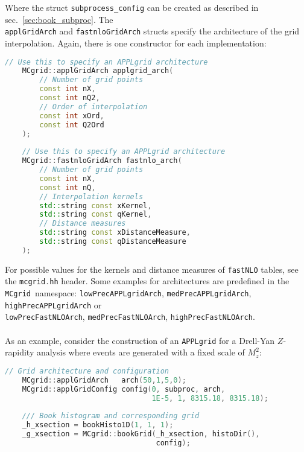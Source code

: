 \documentclass[11pt]{article}
\newcommand{\mcgrid} {{\tt MCgrid}\xspace}
\newcommand{\appl} {{\tt APPLgrid}\xspace}
\newcommand{\fnlo} {{\tt fastNLO}\xspace}
\begin{document}
Where the struct \lstinline[language=c++]{subprocess_config} can be created as described in sec.~\ref{sec:book_subproc}. The \\ \lstinline[language=c++]{applGridArch} and \lstinline[language=c++]{fastnloGridArch} structs specify the architecture of the grid interpolation. Again, there is one constructor for each implementation:
\clearpage
  \begin{lstlisting}[language=c++]
    // Use this to specify an APPLgrid architecture
	MCgrid::applGridArch applgrid_arch(
	    // Number of grid points
		const int nX,
		const int nQ2,
		// Order of interpolation
		const int xOrd,	
		const int Q2Ord
	);
	
	// Use this to specify an APPLgrid architecture
	MCgrid::fastnloGridArch fastnlo_arch(
	    // Number of grid points
		const int nX,
		const int nQ,
		// Interpolation kernels
		std::string const xKernel,
		std::string const qKernel,
		// Distance measures
		std::string const xDistanceMeasure,
		std::string const qDistanceMeasure
	);
 \end{lstlisting}
 For possible values for the kernels and distance measures of \fnlo tables, see the \lstinline[language=c++]{mcgrid.hh} header. Some examples for architectures are predefined in the \mcgrid\ \mbox{namespace}: \lstinline[language=c++]{lowPrecAPPLgridArch}, \lstinline[language=c++]{medPrecAPPLgridArch}, \lstinline[language=c++]{highPrecAPPLgridArch} or \\
     \lstinline[language=c++]{lowPrecFastNLOArch}, \lstinline[language=c++]{medPrecFastNLOArch}, \lstinline[language=c++]{highPrecFastNLOArch}.
\\\\
 As an example, consider the construction of an \appl for a Drell-Yan $Z$-rapidity analysis where events are generated with a fixed scale of $M_z^2$:
\clearpage
   \begin{lstlisting}[language=c++]
    // Grid architecture and configuration
    MCgrid::applGridArch   arch(50,1,5,0);
    MCgrid::applGridConfig config(0, subproc, arch,
                                  1E-5, 1, 8315.18, 8315.18);
   
    /// Book histogram and corresponding grid
    _h_xsection = bookHisto1D(1, 1, 1);
    _g_xsection = MCgrid::bookGrid(_h_xsection, histoDir(),
                                   config);
\end{lstlisting}
\end{document}
